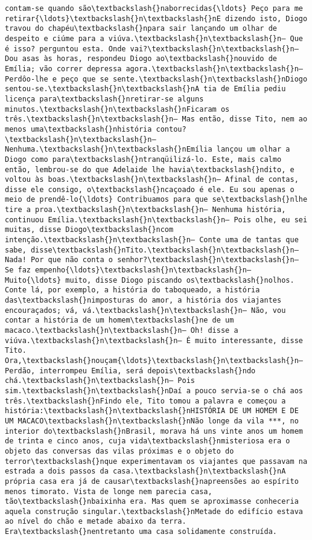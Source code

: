 \documentclass[11pt]{article}
\begin{document}
\begin{Verbatim}[commandchars=\\\{\}]
contam-se quando são\textbackslash{}naborrecidas{\ldots} Peço para me retirar{\ldots}\textbackslash{}n\textbackslash{}nE dizendo isto, Diogo travou do chapéu\textbackslash{}npara sair lançando um olhar de despeito e ciúme para a viúva.\textbackslash{}n\textbackslash{}n— Que é isso? perguntou esta. Onde vai?\textbackslash{}n\textbackslash{}n— Dou asas às horas, respondeu Diogo ao\textbackslash{}nouvido de Emília; vão correr depressa agora.\textbackslash{}n\textbackslash{}n— Perdôo-lhe e peço que se sente.\textbackslash{}n\textbackslash{}nDiogo sentou-se.\textbackslash{}n\textbackslash{}nA tia de Emília pediu licença para\textbackslash{}nretirar-se alguns minutos.\textbackslash{}n\textbackslash{}nFicaram os três.\textbackslash{}n\textbackslash{}n— Mas então, disse Tito, nem ao menos uma\textbackslash{}nhistória contou?\textbackslash{}n\textbackslash{}n— Nenhuma.\textbackslash{}n\textbackslash{}nEmília lançou um olhar a Diogo como para\textbackslash{}ntranqüilizá-lo. Este, mais calmo então, lembrou-se do que Adelaide lhe havia\textbackslash{}ndito, e voltou às boas.\textbackslash{}n\textbackslash{}n— Afinal de contas, disse ele consigo, o\textbackslash{}ncaçoado é ele. Eu sou apenas o meio de prendê-lo{\ldots} Contribuamos para que se\textbackslash{}nlhe tire a proa.\textbackslash{}n\textbackslash{}n— Nenhuma história, continuou Emília.\textbackslash{}n\textbackslash{}n— Pois olhe, eu sei muitas, disse Diogo\textbackslash{}ncom intenção.\textbackslash{}n\textbackslash{}n— Conte uma de tantas que sabe, disse\textbackslash{}nTito.\textbackslash{}n\textbackslash{}n— Nada! Por que não conta o senhor?\textbackslash{}n\textbackslash{}n— Se faz empenho{\ldots}\textbackslash{}n\textbackslash{}n— Muito{\ldots} muito, disse Diogo piscando os\textbackslash{}nolhos. Conte lá, por exemplo, a história do taboqueado, a história das\textbackslash{}nimposturas do amor, a história dos viajantes encouraçados; vá, vá.\textbackslash{}n\textbackslash{}n— Não, vou contar a história de um homem\textbackslash{}ne de um macaco.\textbackslash{}n\textbackslash{}n— Oh! disse a viúva.\textbackslash{}n\textbackslash{}n— É muito interessante, disse Tito. Ora,\textbackslash{}nouçam{\ldots}\textbackslash{}n\textbackslash{}n— Perdão, interrompeu Emília, será depois\textbackslash{}ndo chá.\textbackslash{}n\textbackslash{}n— Pois sim.\textbackslash{}n\textbackslash{}nDaí a pouco servia-se o chá aos três.\textbackslash{}nFindo ele, Tito tomou a palavra e começou a história:\textbackslash{}n\textbackslash{}nHISTÓRIA DE UM HOMEM E DE UM MACACO\textbackslash{}n\textbackslash{}nNão longe da vila ***, no interior do\textbackslash{}nBrasil, morava há uns vinte anos um homem de trinta e cinco anos, cuja vida\textbackslash{}nmisteriosa era o objeto das conversas das vilas próximas e o objeto do terror\textbackslash{}nque experimentavam os viajantes que passavam na estrada a dois passos da casa.\textbackslash{}n\textbackslash{}nA própria casa era já de causar\textbackslash{}napreensões ao espírito menos timorato. Vista de longe nem parecia casa, tão\textbackslash{}nbaixinha era. Mas quem se aproximasse conheceria aquela construção singular.\textbackslash{}nMetade do edifício estava ao nível do chão e metade abaixo da terra. Era\textbackslash{}nentretanto uma casa solidamente construída. 
\end{Verbatim}
\end{document}
